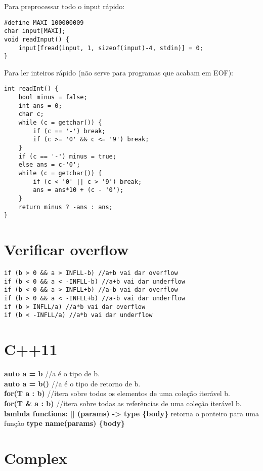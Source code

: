 \begin{multicols}{2}
Para preprocessar todo o input rápido:

\begin{lstlisting}
#define MAXI 100000009
char input[MAXI];
void readInput() {
	input[fread(input, 1, sizeof(input)-4, stdin)] = 0;
}
\end{lstlisting}

Para ler inteiros rápido (não serve para programas que acabam em EOF):

\begin{lstlisting}
int readInt() {
	bool minus = false;
	int ans = 0;
	char c;
	while (c = getchar()) {
		if (c == '-') break;
		if (c >= '0' && c <= '9') break;
	}
	if (c == '-') minus = true;
	else ans = c-'0';
	while (c = getchar()) {
		if (c < '0' || c > '9') break;
		ans = ans*10 + (c - '0');
	}
	return minus ? -ans : ans;
}
\end{lstlisting}

\newpage

\section{Verificar overflow}

\begin{lstlisting}
if (b > 0 && a > INFLL-b) //a+b vai dar overflow
if (b < 0 && a < -INFLL-b) //a+b vai dar underflow
if (b < 0 && a > INFLL+b) //a-b vai dar overflow
if (b > 0 && a < -INFLL+b) //a-b vai dar underflow
if (b > INFLL/a) //a*b vai dar overflow
if (b < -INFLL/a) //a*b vai dar underflow
\end{lstlisting}

\section{C++11}

\textbf{auto a = b} //a é o tipo de b.\\
\textbf{auto a = b()} //a é o tipo de retorno de b.\\
\textbf{for(T a : b)} //itera sobre todos os elementos de uma coleção iterável b.\\
\textbf{for(T \& a : b)} //itera sobre todas as referências de uma coleção iterável b.\\
\textbf{lambda functions: [] (params) -> type \{body\}} retorna o ponteiro para uma função \textbf{type name(params) \{body\} }

\section{Complex}


\end{multicols}
